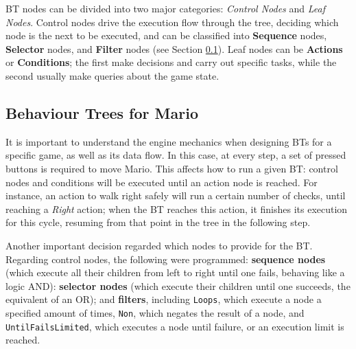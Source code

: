 \documentclass[conference]{IEEEtran}
\begin{document}
BT nodes can be divided into two major categories:
\textit{Control Nodes} and \textit{Leaf Nodes}. Control nodes drive
the execution flow through the tree, deciding which node is the next to 
be executed, and can be classified into \textbf{Sequence} nodes,
\textbf{Selector} nodes, and \textbf{Filter} nodes (see Section \ref{subsec:bt4Mario}).
Leaf nodes can be \textbf{Actions} or \textbf{Conditions}; the first
make decisions and carry out specific tasks, while the second usually 
make queries about the game state.


\subsection{Behaviour Trees for Mario} \label{subsec:bt4Mario}

It is important to understand the engine mechanics
when designing BTs for a specific game, as well as its data flow.
In this case, at every step, a set of pressed buttons is required to move Mario.
This affects how to run a given BT: control nodes and conditions
will be executed until an action node is reached. For instance,
an action to walk right safely will run a certain number of checks,
until reaching a \textit{Right} action; when the 
BT reaches this action, it finishes its execution for this cycle, resuming 
from that point in the tree in the following step.


Another important decision regarded which nodes to provide for the BT.
Regarding control nodes, the following were programmed: 
\textbf{sequence nodes} (which execute all their children from
left to right until one fails, behaving like a logic AND):
\textbf{selector nodes} (which execute their children
until one succeeds, the equivalent of an OR); and 
\textbf{filters}, including \texttt{Loops}, which execute a node
a specified amount of times, \texttt{Non}, which negates the result of a
node, and \texttt{UntilFailsLimited}, which
executes a node until failure, or an execution limit is reached.
\end{document}
